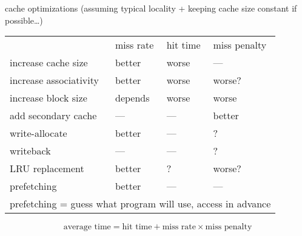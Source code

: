 
\begin{frame}{cache optimizations}
(assuming typical locality + keeping cache size constant if possible\ldots)
\newcommand{\good}{\textcolor{green!50!black}{better}}
\newcommand{\bad}{\textcolor{red!50!black}{worse}}
\begin{tabular}{llll}
~ & miss rate & hit time & miss penalty \\
increase cache size & \good & \bad & --- \\
increase associativity & \good & \bad & \bad? \\
increase block size & depends & \bad & \bad \\
add secondary cache & --- & --- & \good \\
write-allocate & \good & --- & ? \\
writeback & --- & --- & ? \\
LRU replacement & \good & ? & \bad? \\
prefetching & \good & --- & --- \\
\multicolumn{4}{l}{\small prefetching = guess what program will use, access in advance}
\end{tabular}
\[
\text{average time} = \text{hit time} + \text{miss rate} \times \text{miss penalty}
\]
\end{frame}
